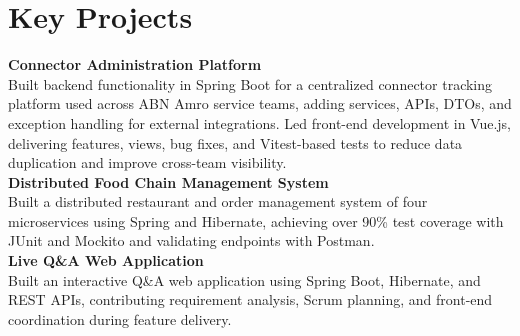 \section*{Key Projects}

\textbf{Connector Administration Platform}\\
Built backend functionality in Spring Boot for a centralized connector tracking platform used across ABN Amro service teams, adding services, APIs, DTOs, and exception handling for external integrations. Led front-end development in Vue.js, delivering features, views, bug fixes, and Vitest-based tests to reduce data duplication and improve cross-team visibility.\\[4pt]
\textbf{Distributed Food Chain Management System}\\
Built a distributed restaurant and order management system of four microservices using Spring and Hibernate, achieving over 90\% test coverage with JUnit and Mockito and validating endpoints with Postman.\\[4pt]
\textbf{Live Q\&A Web Application}\\
Built an interactive Q\&A web application using Spring Boot, Hibernate, and REST APIs, contributing requirement analysis, Scrum planning, and front-end coordination during feature delivery.
